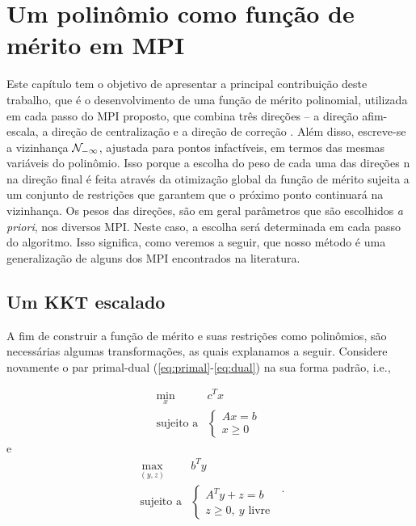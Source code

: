 





	\chapter{Um polinômio como função de mérito em \ac{MPI}}
\label{chap:merit-function}


Este capítulo tem o objetivo de apresentar a principal contribuição deste trabalho, que é o desenvolvimento de uma função de mérito polinomial,  utilizada em cada passo do \acl{MPI} proposto,  que combina três direções -- a direção afim-escala, a direção de centralização e a direção de correção . Além disso, escreve-se a vizinhança $\mathcal{N}_{-\infty}$, ajustada para pontos infactíveis, em termos das mesmas variáveis do polinômio. Isso porque a escolha do peso de cada uma das direções n na direção final é feita através da  otimização global da função de mérito sujeita a um conjunto de restrições que garantem que o próximo ponto continuará na vizinhança. Os pesos das direções, são em geral parâmetros que são escolhidos  \emph{a priori}, nos diversos \ac{MPI}. Neste caso, a escolha será determinada em cada passo do algoritmo. Isso significa, como veremos a seguir, que nosso método é uma generalização de alguns dos \ac{MPI} encontrados na literatura. 

\section{Um KKT escalado}


 
A fim de construir a função de mérito e suas restrições como polinômios, são necessárias algumas transformações, as quais explanamos a seguir. Considere novamente o par primal-dual  (\ref{eq:primal}-\ref{eq:dual}) na sua forma padrão,
i.e.,  

 \begin{equation*}
	\begin{array}{lc}
\displaystyle \min_{x} & c^Tx \\
\text{sujeito a} &\begin{cases} Ax = b \\
				 x \geq 0	
				 \end{cases}\
\end{array}\tag{$P$}
\end{equation*}
e 
 \begin{equation}
	\begin{array}{lc}
\displaystyle \max_{(y,z)} & b^Ty \\
\text{sujeito a} &\begin{cases} A^Ty + z = b \\
				 z \geq 0, \:y \text{ livre}	
				 \end{cases}\
\end{array}.
\tag{$D$}
\end{equation}

